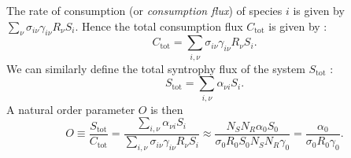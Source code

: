 \documentclass[12pt]{report}
\begin{document}
The rate of consumption (or \textit{consumption flux}) of species $i$ is given by $\sum_\nu \sigma_{i\nu}\gamma_{i\nu}R_\nu S_i$. Hence the total consumption flux $C_{\text{tot}}$ is given by :
\begin{equation}
C_{\text{tot}} = \sum_{i, \nu} \sigma_{i\nu} \gamma_{i\nu}R_\nu S_i.
\end{equation}
We can similarly define the total syntrophy flux of the system $S_{\text{tot}}$ :
\begin{equation}
S_{\text{tot}} = \sum_{i, \nu} \alpha_{\nu i} S_i.
\end{equation}
A natural order parameter $O$ is then
\begin{equation}
O \equiv \frac{S_{\text{tot}}}{C_{\text{tot}}} = \frac{\sum_{i, \nu} \alpha_{\nu i} S_i}{\sum_{i,\nu}\sigma_{i\nu} \gamma_{i\nu}R_\nu S_i} \approx \frac{N_S N_R \alpha_0 S_0}{\sigma_0 R_0 S_0 N_S N_R \gamma_0} = \frac{\alpha_0}{\sigma_0 R_0 \gamma_0}.
\end{equation}
\end{document}
